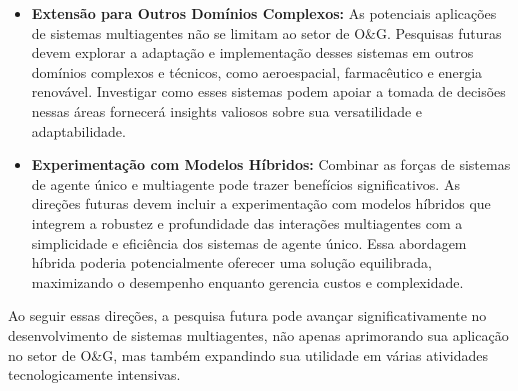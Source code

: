 \begin{itemize}
                \item \textbf{Extensão para Outros Domínios Complexos:}
                    As potenciais aplicações de sistemas multiagentes não se limitam ao setor de O\&G. Pesquisas futuras devem explorar a adaptação e implementação desses sistemas em outros domínios complexos e técnicos, como aeroespacial, farmacêutico e energia renovável. Investigar como esses sistemas podem apoiar a tomada de decisões nessas áreas fornecerá insights valiosos sobre sua versatilidade e adaptabilidade.
                    
                \item \textbf{Experimentação com Modelos Híbridos:}
                    Combinar as forças de sistemas de agente único e multiagente pode trazer benefícios significativos. As direções futuras devem incluir a experimentação com modelos híbridos que integrem a robustez e profundidade das interações multiagentes com a simplicidade e eficiência dos sistemas de agente único. Essa abordagem híbrida poderia potencialmente oferecer uma solução equilibrada, maximizando o desempenho enquanto gerencia custos e complexidade.
            
            \end{itemize}
            
            Ao seguir essas direções, a pesquisa futura pode avançar significativamente no desenvolvimento de sistemas multiagentes, não apenas aprimorando sua aplicação no setor de O\&G, mas também expandindo sua utilidade em várias atividades tecnologicamente intensivas.
    
    
